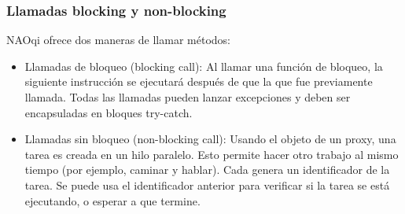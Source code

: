 \subsubsection{Llamadas blocking y non-blocking}
\label{\detokenize{chapter_one/naoqi:llamadas-blocking-y-non-blocking}}
NAOqi ofrece dos maneras de llamar métodos:
\begin{itemize}
\item {} 
Llamadas de bloqueo (blocking call): Al llamar una función de bloqueo, la siguiente instrucción se ejecutará después de que la que fue previamente llamada. Todas las llamadas pueden lanzar excepciones y deben ser encapsuladas en bloques try-catch.

\item {} 
Llamadas sin bloqueo (non-blocking call): Usando el objeto  de un proxy, una tarea es creada en un hilo paralelo. Esto permite hacer otro trabajo al mismo tiempo (por ejemplo, caminar y hablar). Cada  genera un identificador de la tarea. Se puede usa el identificador anterior para verificar si la tarea se está ejecutando, o esperar a que termine.

\end{itemize}


%
%
%
%
%
%


